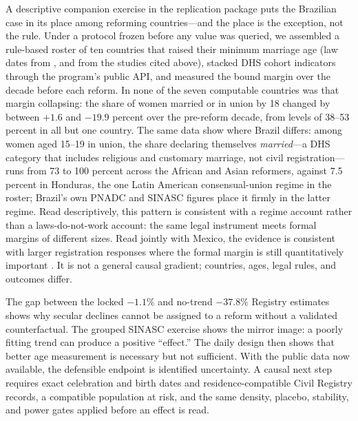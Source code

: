 \documentclass[12pt]{article}
\begin{document}
A descriptive companion exercise in the replication package puts the Brazilian case in
its place among reforming countries---and the place is the exception, not the rule.
Under a protocol frozen before any value was queried, we assembled a rule-based roster
of ten countries that raised their minimum marriage age (law dates from
\citealp{BatyraPesando2021}, and from the studies cited above), stacked DHS cohort
indicators through the program's public API, and measured the bound margin over the
decade before each reform. In none of the seven computable countries was that margin
collapsing: the share of women married or in union by 18 changed by between $+1.6$ and
$-19.9$ percent over the pre-reform decade, from levels of 38--53 percent in all but
one country. The same data show where Brazil differs: among women aged 15--19 in
union, the share declaring themselves \emph{married}---a DHS category that includes
religious and customary marriage, not civil registration---runs from 73 to 100 percent
across the African and Asian reformers, against 7.5 percent in Honduras, the one
Latin American consensual-union regime in the roster; Brazil's own PNADC and SINASC
figures place it firmly in the latter regime. Read descriptively, this pattern is
consistent with a regime account rather than a laws-do-not-work account: the same legal
instrument meets formal margins of different sizes. Read jointly with Mexico, the
evidence is consistent with larger registration responses where the formal margin is
still quantitatively important \citep{BellesObreroLombardi2023}. It is not a general
causal gradient; countries, ages, legal rules, and outcomes differ.

The gap between the locked $-1.1\%$ and no-trend $-37.8\%$ Registry estimates shows why
secular declines cannot be assigned to a reform without a validated counterfactual. The
grouped SINASC exercise shows the mirror image: a poorly fitting trend can produce a
positive ``effect.'' The daily design then shows that better age measurement is
necessary but not sufficient. With the public data now available, the defensible endpoint
is identified uncertainty. A causal next step requires exact celebration and birth dates
and residence-compatible Civil Registry records, a compatible population at risk, and
the same density, placebo, stability, and power gates applied before an effect is read.



\clearpage
\appendix
\end{document}
